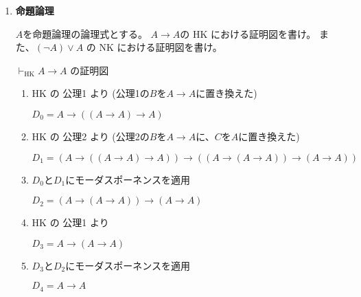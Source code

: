 \documentclass[12pt,b5paper]{ltjsarticle}
\begin{document}
\begin{enumerate}
  \item
       \textbf{命題論理}

      $A$を命題論理の論理式とする。
      $A\to A$の
      HK
      における証明図を書け。
      また、$(\neg A) \vee A$
      の
      NK
      における証明図を書け。

      \dotfill

       $\vdash_{\mathrm{HK}} A \to A$
       の証明図

       \begin{enumerate}
        \renewcommand{\labelenumii}{[\arabic{enumii}]}
        \item
             HK の 公理1 より
             (公理1の$B$を$A\to A$に置き換えた)

             $D_{0} = A \to ( (A\to A) \to A)$

        \item
             HK の 公理2 より
             (公理2の$B$を$A\to A$に、$C$を$A$に置き換えた)

             $D_{1} = (A \to ((A\to A) \to A)) \to ((A \to (A\to A)) \to (A \to A))$

        \item
             $D_{0}$と$D_{1}$にモーダスポーネンスを適用

             $D_{2} = (A \to (A\to A)) \to (A \to A)$

        \item
             HK の 公理1 より

             $D_{3} = A \to (A\to A)$

        \item
             $D_{3}$と$D_{2}$にモーダスポーネンスを適用

             $D_{4} = A \to A$
       \end{enumerate}



\end{enumerate}
\end{document}
